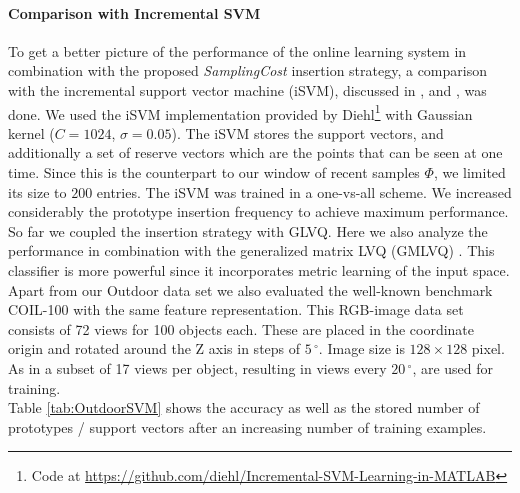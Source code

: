 \documentclass[conference]{IEEEtran}
\begin{document}
\paragraph{Comparison with Incremental SVM}
To get a better picture of the performance of the online learning system in combination with the proposed \textit{SamplingCost} insertion strategy, 
a comparison with the incremental support vector machine (iSVM), discussed in \cite{cauwenbergs01incrementaldecremental}, \cite{Diehl03svmincremental} and \cite{Laskov:2006:ISV:1248547.1248616}, was done. 
We used the iSVM implementation provided by Diehl\footnote[1]{Code at \url{https://github.com/diehl/Incremental-SVM-Learning-in-MATLAB}} \cite{Diehl03svmincremental} with Gaussian kernel ($C=1024$, $\sigma=0.05$). 
The iSVM stores the support vectors, and additionally a set of  reserve vectors which are the points that can be seen at one time. 
Since this is the counterpart to our window of recent samples $\Phi$, we limited its
size to $200$ entries. The iSVM was trained in a one-vs-all scheme.
We increased considerably the prototype insertion frequency to achieve  maximum performance. 
So far we coupled the insertion strategy with GLVQ. Here we also analyze the performance in combination with the 
generalized matrix LVQ (GMLVQ) \cite{Schneider:2009:ARM:1737743.1737754}. This classifier is more powerful since it incorporates metric learning
 of the input space.\\
Apart from our Outdoor data set we also evaluated the well-known benchmark COIL-100 \cite{CAVE_0189}  with the same feature 
representation. This RGB-image data set consists of 72 views for 100 objects each. 
These are placed in the coordinate origin and rotated around the Z axis in steps of  $5\,^{\circ}$.
Image size is $128 \times 128$ pixel. 
As in \cite{conf/iccv/WallravenCG03} a subset of 17 views per object, resulting in views every $20\,^{\circ}$, are used for training.\\
Table \ref{tab:OutdoorSVM} shows the accuracy as well as the stored number of prototypes / support vectors after an increasing number of training examples.
\captionsetup{position=top}
\end{document}
